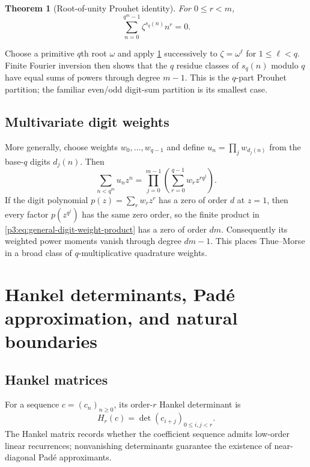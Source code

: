 \documentclass[11pt,oneside]{article}
\newtheorem{theorem}{Theorem}[section]
\theoremstyle{definition}
\theoremstyle{remark}
\begin{document}
\begin{theorem}[Root-of-unity Prouhet identity]\label{p3:thm:baseq-prouhet}
For $0\le r<m$,
\begin{equation}\label{p3:eq:baseq-prouhet}
 \sum_{n=0}^{q^m-1}\zeta^{s_q(n)}n^r=0.
\end{equation}
\end{theorem}

Choose a primitive $q$th root $\omega$ and apply
\cref{p3:thm:baseq-prouhet} successively to $\zeta=\omega^\ell$ for
$1\le\ell<q$.  Finite Fourier inversion then shows that the $q$ residue
classes of $s_q(n)$ modulo $q$ have equal sums of powers through degree
$m-1$.  This is the $q$-part Prouhet partition; the familiar even/odd
digit-sum partition is its smallest case.

\subsection{Multivariate digit weights}

More generally, choose weights $w_0,\ldots,w_{q-1}$ and define
$u_n=\prod_jw_{d_j(n)}$ from the base-$q$ digits $d_j(n)$.  Then
\begin{equation}\label{p3:eq:general-digit-weight-product}
 \sum_{n<q^m}u_nz^n
 =\prod_{j=0}^{m-1}
  \left(\sum_{r=0}^{q-1}w_rz^{rq^j}\right).
\end{equation}
If the digit polynomial $p(z)=\sum_rw_rz^r$ has a zero of order $d$ at
$z=1$, then every factor $p(z^{q^j})$ has the same zero order, so the finite
product in \cref{p3:eq:general-digit-weight-product} has a zero of order $dm$.
Consequently its weighted power moments vanish through degree $dm-1$.  This
places Thue--Morse in a broad class of $q$-multiplicative quadrature weights.

\section{Hankel determinants, Pad\'e approximation, and natural boundaries}\label{p3:sec:hankel}

\subsection{Hankel matrices}

For a sequence $c=(c_n)_{n\ge0}$, its order-$r$ Hankel determinant is
\begin{equation}\label{p3:eq:hankel-def}
 H_r(c)=\det(c_{i+j})_{0\le i,j<r}.
\end{equation}
The Hankel matrix records whether the coefficient sequence admits low-order
linear recurrences; nonvanishing determinants guarantee the existence of
near-diagonal Pad\'e approximants.
\end{document}
